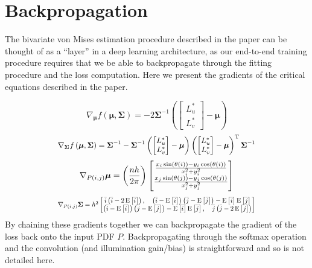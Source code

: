 \documentclass[10pt,twocolumn,letterpaper]{article}
\newcommand{\binwidth}{h}
\newcommand{\E}[1]{\operatorname{E}\left\lbrack#1\right\rbrack}
\newcommand{\lossdata}[1]{f\left( #1 \right )}
\begin{document}
\section{Backpropagation}

The bivariate von Mises estimation procedure described in the paper can be
thought of as a ``layer'' in a deep learning architecture, as our end-to-end
training procedure requires that we be able to backpropagate through the fitting
procedure and the loss computation. Here we present the gradients of the critical
equations described in the paper.

\newcommand{\ishift}{\bar{i}}
\newcommand{\jshift}{\bar{j}}

\begin{equation}
\nabla_{\boldsymbol{\mu}} \lossdata{\boldsymbol{\mu}, \boldsymbol{\Sigma}} = -2 \boldsymbol{\Sigma}^{-1} \left( \begin{bmatrix}
L^*_u \\ L^*_v
\end{bmatrix} - \boldsymbol{\mu} \right)
\end{equation}
\begin{equation}
\resizebox{3.25in}{!}{$
\nabla_{\boldsymbol{\Sigma}} \lossdata{\boldsymbol{\mu}, \boldsymbol{\Sigma}}  = \boldsymbol{\Sigma}^{-1} - \boldsymbol{\Sigma}^{-1} \left( \begin{bmatrix}
L^*_u \\ L^*_v
\end{bmatrix} - \boldsymbol{\mu} \right) \left( \begin{bmatrix}
L^*_u \\ L^*_v
\end{bmatrix} - \boldsymbol{\mu} \right)^\mathrm{T} \boldsymbol{\Sigma}^{-1} \nonumber
$}
\end{equation}
\begin{equation}
\nabla_{P(i,j)}\boldsymbol{\mu} =
\left({n \binwidth \over 2\pi}\right) \begin{bmatrix}
{x_i \sin(\theta(i)) - y_i \cos(\theta(i)) \over x_i^2 + y_i^2} \\
{x_j \sin(\theta(j)) - y_j \cos(\theta(j)) \over x_j^2 + y_j^2}
\end{bmatrix}
\end{equation}
\begin{equation}
\resizebox{3.25in}{!}{$
\nabla_{P(i,j)}\boldsymbol{\Sigma} = h^2 \begin{bmatrix}
\ishift \left( \ishift - 2\E{\ishift} \right), \quad
\left( \ishift - \E{\ishift} \right) \left( \jshift - \E{\jshift} \right) - \E{\ishift}\E{\jshift} \\
\left( \ishift - \E{\ishift} \right) \left( \jshift - \E{\jshift} \right) - \E{\ishift}\E{\jshift}, \quad
\jshift \left( \jshift - 2\E{\jshift} \right) \nonumber
\end{bmatrix}
$}
\end{equation}
By chaining these gradients together we can backpropagate the gradient of the loss
back onto the input PDF $P$. Backpropagating through the softmax operation and the convolution
(and illumination gain/bias) is straightforward and so is not detailed here.
\end{document}
